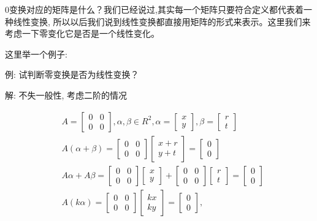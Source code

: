 0变换对应的矩阵是什么？我们已经说过,其实每一个矩阵只要符合定义都代表着一种线性变换, 所以以后我们说到线性变换都直接用矩阵的形式来表示。这里我们来考虑一下零变化它是否是一个线性变化。

这里举一个例子: 

例: 试判断零变换是否为线性变换？

解: 不失一般性, 考虑二阶的情况

\begin{align*}
  & A = \begin{bmatrix} 0 & 0 \\ 0 & 0 \end{bmatrix}, \alpha,\beta \in R^2,  \alpha=\begin{bmatrix}  x \\ y\end{bmatrix} , \beta = \begin{bmatrix} r \\ t\end{bmatrix} \\
  & A(\alpha+\beta) = \begin{bmatrix} 0&0\\0&0\end{bmatrix}\begin{bmatrix} x+r \\ y+t \end{bmatrix} = \begin{bmatrix} 0 \\ 0 \end{bmatrix} \\
  & A\alpha+A\beta = \begin{bmatrix} 0&0\\0&0\end{bmatrix}\begin{bmatrix} x \\ y \end{bmatrix} + \begin{bmatrix} 0&0\\0&0\end{bmatrix}\begin{bmatrix} r \\ t \end{bmatrix}  = \begin{bmatrix} 0 \\ 0 \end{bmatrix} \\
  & A(k\alpha) = \begin{bmatrix} 0 & 0 \\ 0 & 0\end{bmatrix}\begin{bmatrix}kx \\ ky \end{bmatrix} = \begin{bmatrix} 0 \\ 0 \end{bmatrix}, \\

\end{align*}
